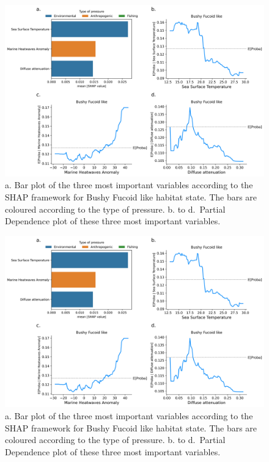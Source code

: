 \begin{figure}
\hypertarget{fig:chap3figS38}{%
\centering
\includegraphics{03-Chapitre3/figures/supplementary/04-pdp_Bushy Fucoid like.png}
\caption{a. Bar plot of the three most important variables according to
the SHAP framework for Bushy Fucoid like habitat state. The bars are
coloured according to the type of pressure. b. to d.~Partial Dependence
plot of these three most important variables.}\label{fig:chap3figS38}
}
\end{figure}

\begin{figure}
\hypertarget{fig:chap3figS39}{%
\centering
\includegraphics{03-Chapitre3/figures/supplementary/04-pdp_Bushy Fucoid like.png}
\caption{a. Bar plot of the three most important variables according to
the SHAP framework for Bushy Fucoid like habitat state. The bars are
coloured according to the type of pressure. b. to d.~Partial Dependence
plot of these three most important variables.}\label{fig:chap3figS39}
}
\end{figure}

